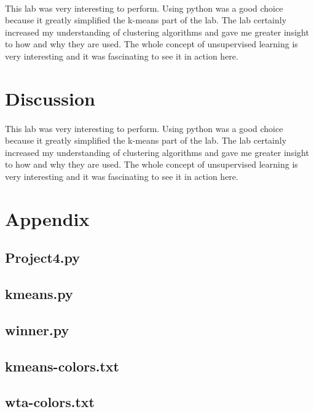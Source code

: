 \documentclass{article}
\begin{document}
\paragraph{}
This lab was very interesting to perform. Using python was a good
choice because it greatly simplified the k-means part of the lab.
The lab certainly increased my understanding of clustering algorithms 
and gave me greater insight to how and why they are used. The whole
concept of unsupervised learning is very interesting and it was fascinating
to see it in action here.
\newpage


\section*{Discussion}
\paragraph{}
This lab was very interesting to perform. Using python was a good
choice because it greatly simplified the k-means part of the lab.
The lab certainly increased my understanding of clustering algorithms 
and gave me greater insight to how and why they are used. The whole
concept of unsupervised learning is very interesting and it was fascinating
to see it in action here.
\newpage


\appendix
\section*{Appendix}
\subsection*{Project4.py}

\newpage
\subsection*{kmeans.py}

\newpage
\subsection*{winner.py}

\newpage
\subsection*{kmeans-colors.txt}

\newpage
\subsection*{wta-colors.txt}

\end{document}
